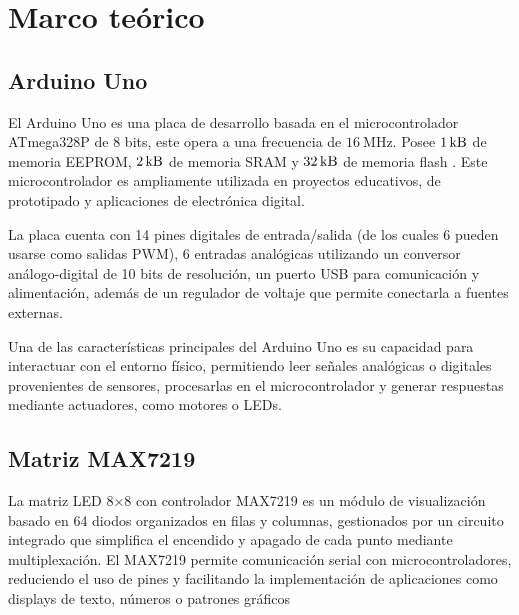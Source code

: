 \section{Marco teórico}
\subsection{Arduino Uno}
El Arduino Uno es una placa de desarrollo basada en el microcontrolador ATmega328P de $8$ bits, este opera a una
frecuencia de $\SI{16}{\mega \hertz}$. Posee $\SI{1}{\kilo \byte}$ de memoria EEPROM, $\SI{2}{\kilo \byte}$ de memoria 
SRAM y $\SI{32}{\kilo \byte}$ de memoria flash \cite{medina-arduino}. Este microcontrolador es ampliamente utilizada en proyectos educativos,
de prototipado y aplicaciones de electrónica digital.


La placa cuenta con 14 pines digitales de entrada/salida 
(de los cuales 6 pueden usarse como salidas PWM),
6 entradas analógicas utilizando un conversor análogo-digital de 10 bits de resolución, 
un puerto USB para comunicación y alimentación, 
además de un regulador de voltaje que permite conectarla a fuentes externas. 


Una de las características principales del Arduino Uno es su capacidad para interactuar con el entorno físico,
permitiendo leer señales analógicas o digitales provenientes de sensores, procesarlas en el microcontrolador 
y generar respuestas mediante actuadores, como motores o LEDs.

\subsection{Matriz MAX7219}
La matriz LED 8×8 con controlador MAX7219 es un módulo de visualización basado en 64 diodos organizados en filas y columnas, gestionados por un
circuito integrado que simplifica el encendido y apagado de cada punto mediante multiplexación. El MAX7219 permite comunicación serial con 
microcontroladores, reduciendo el uso de pines y facilitando la implementación de aplicaciones como displays de texto, números o patrones gráficos